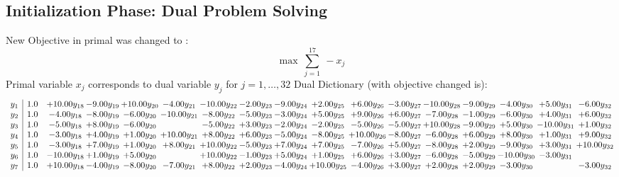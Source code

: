 \documentclass[9pt]{article}
\begin{document}
\subsection{Initialization Phase: Dual Problem Solving}
New Objective in primal was changed to : \[ \max\ \sum_{j=1}^{17}\ - x_j \] 
Primal variable $x_j$ corresponds to dual variable $y_j$ for $j = 1,\ldots,32$
Dual Dictionary (with objective changed is): 
\[\begin{array}{c| c c@{\hskip 2pt} c@{\hskip 2pt} c@{\hskip 2pt} c@{\hskip 2pt} c@{\hskip 2pt} c@{\hskip 2pt} c@{\hskip 2pt} c@{\hskip 2pt} c@{\hskip 2pt} c@{\hskip 2pt} c@{\hskip 2pt} c@{\hskip 2pt} c@{\hskip 2pt} c@{\hskip 2pt} c@{\hskip 2pt} }
 y_{1}   &  1.0 & + 10.00 y_{18} & -9.00 y_{19} & + 10.00 y_{20} & -4.00 y_{21} & -10.00 y_{22} & -2.00 y_{23} & -9.00 y_{24} & +  2.00 y_{25} & +  6.00 y_{26} & -3.00 y_{27} & -10.00 y_{28} & -9.00 y_{29} & -4.00 y_{30} & +  5.00 y_{31} & -6.00 y_{32}\\
 y_{2}   &  1.0 & -4.00 y_{18} & -8.00 y_{19} & -6.00 y_{20} & -10.00 y_{21} & -8.00 y_{22} & -5.00 y_{23} & -3.00 y_{24} & +  5.00 y_{25} & +  9.00 y_{26} & +  6.00 y_{27} & -7.00 y_{28} & -1.00 y_{29} & -6.00 y_{30} & +  4.00 y_{31} & +  6.00 y_{32}\\
 y_{3}   &  1.0 & -5.00 y_{18} & +  8.00 y_{19} & -6.00 y_{20} &   & -5.00 y_{22} & +  3.00 y_{23} & -2.00 y_{24} & -2.00 y_{25} & -5.00 y_{26} & -5.00 y_{27} & + 10.00 y_{28} & -9.00 y_{29} & +  5.00 y_{30} & -10.00 y_{31} & +  1.00 y_{32}\\
 y_{4}   &  1.0 & -3.00 y_{18} & +  4.00 y_{19} & +  1.00 y_{20} & + 10.00 y_{21} & +  8.00 y_{22} & +  6.00 y_{23} & -5.00 y_{24} & -8.00 y_{25} & + 10.00 y_{26} & -8.00 y_{27} & -6.00 y_{28} & +  6.00 y_{29} & +  8.00 y_{30} & +  1.00 y_{31} & +  9.00 y_{32}\\
 y_{5}   &  1.0 & -3.00 y_{18} & +  7.00 y_{19} & +  1.00 y_{20} & +  8.00 y_{21} & + 10.00 y_{22} & -5.00 y_{23} & +  7.00 y_{24} & +  7.00 y_{25} & -7.00 y_{26} & +  5.00 y_{27} & -8.00 y_{28} & +  2.00 y_{29} & -9.00 y_{30} & +  3.00 y_{31} & + 10.00 y_{32}\\
 y_{6}   &  1.0 & -10.00 y_{18} & +  1.00 y_{19} & +  5.00 y_{20} &   & + 10.00 y_{22} & -1.00 y_{23} & +  5.00 y_{24} & +  1.00 y_{25} & +  6.00 y_{26} & +  3.00 y_{27} & -6.00 y_{28} & -5.00 y_{29} & -10.00 y_{30} & -3.00 y_{31} &   \\
 y_{7}   &  1.0 & + 10.00 y_{18} & -4.00 y_{19} & -8.00 y_{20} & -7.00 y_{21} & +  8.00 y_{22} & +  2.00 y_{23} & -4.00 y_{24} & + 10.00 y_{25} & -4.00 y_{26} & +  3.00 y_{27} & +  2.00 y_{28} & +  2.00 y_{29} & -3.00 y_{30} &   & -3.00 y_{32}\\

\end{array}\]
\end{document}
